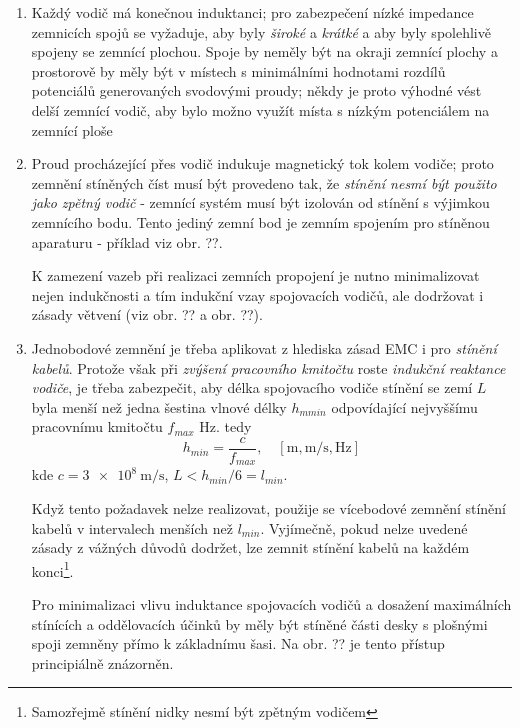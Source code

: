       \begin{enumerate}[leftmargin=20pt,rightmargin=10pt, label=\emph{\alph*})]
        \item Každý vodič má konečnou induktanci; pro zabezpečení nízké impedance zemnicích spojů se
              vyžaduje, aby byly \emph{široké} a \emph{krátké} a aby byly spolehlivě spojeny se
              zemnící plochou. Spoje by neměly být na okraji zemnící plochy a prostorově by měly být
              v místech s minimálními hodnotami rozdílů potenciálů generovaných svodovými proudy;
              někdy je proto výhodné vést delší zemnící vodič, aby bylo možno využít místa s nízkým
              potenciálem na zemnící ploše
        \item Proud procházející přes vodič indukuje magnetický tok kolem vodiče; proto zemnění
              stíněných číst musí být provedeno tak, že \emph{stínění nesmí být použito jako zpětný
              vodič} - zemnící systém musí být izolován od stínění s výjimkou zemnícího bodu. Tento
              jediný zemní bod je zemním spojením pro stíněnou aparaturu - příklad viz obr. ??.

              K zamezení vazeb při realizaci zemních propojení je nutno minimalizovat nejen
              indukčnosti a tím indukční vzay spojovacích vodičů, ale dodržovat i zásady větvení
              (viz obr. ?? a obr. ??).
        \item Jednobodové zemnění je třeba aplikovat z hlediska zásad EMC i pro \emph{stínění
              kabelů}. Protože však při \emph{zvýšení pracovního kmitočtu} roste \emph{indukční
              reaktance vodiče}, je třeba zabezpečit, aby délka spojovacího vodiče stínění se zemí
              \(L\) byla menší než jedna šestina vlnové délky \(h_{mmin}\) odpovídající nejvyššímu
              pracovnímu kmitočtu \(f_{max}\) \si{\Hz}. tedy
              \begin{equation*}
                h_{min} = \dfrac{c}{f_{max}}, \quad [\si{\m}, \si{\m\per\s}, \si{\Hz}]
              \end{equation*}
              kde \(c = \SI{3e8}{\m\per\s}\), \(L<h_{min}/6 = l_{min}\). 

              Když tento požadavek nelze realizovat, použije se vícebodové zemnění stínění kabelů v
              intervalech menších než \(l_{min}\). Vyjímečně, pokud nelze uvedené zásady z vážných
              důvodů dodržet, lze zemnit stínění kabelů na každém konci\footnote{Samozřejmě stínění
              nidky nesmí být zpětným vodičem}.

              Pro minimalizaci vlivu induktance spojovacích vodičů a dosažení maximálních stínících
              a oddělovacích účinků by měly být stíněné části desky s plošnými spoji zemněny přímo k
              základnímu šasi. Na obr. ?? je tento přístup principiálně znázorněn.
                      
      \end{enumerate}

